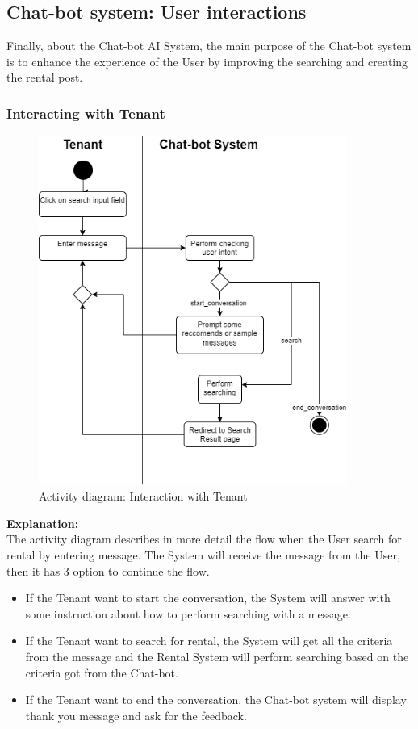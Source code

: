 \newpage
\subsection{Chat-bot system: User interactions}
Finally, about the Chat-bot AI System, the main purpose of the Chat-bot system is to enhance the experience of the User by improving the searching and creating the rental post.
\subsubsection{Interacting with Tenant}
\begin{figure}[H]
    \centering
    \includegraphics[width=0.9\textwidth]{Images/Activity/ac_diag_search_by_chat_bot.png}
    \caption{Activity diagram: Interaction with Tenant}
    \label{fig:Interaction-with-Tenant}
\end{figure}
\noindent \textbf{Explanation:}\\
The activity diagram describes in more detail the flow when the User search for rental by entering message. The System will receive the message from the User, then it has 3 option to continue the flow.
\begin{itemize}
    \item If the Tenant want to start the conversation, the System will answer with some instruction about how to perform searching with a message.
    \item If the Tenant want to search for rental, the System will get all the criteria from the message and the Rental System will perform searching based on the criteria got from the Chat-bot.
    \item If the Tenant want to end the conversation, the Chat-bot system will display thank you message and ask for the feedback.
\end{itemize}


